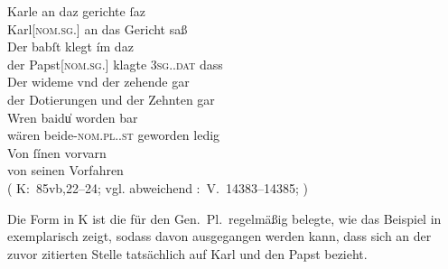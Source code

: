 \begin{exe}
\ex\label{ex:babstimbaideu}
	\gll Karle an daz gerichte ſaz \\
		Karl[\textsc{nom.sg.\MascM}] an das Gericht saß \\
\sn \gll Der babſt klegt ím daz \\
		der Papst[\textsc{nom.sg.\MascM}] klagte \textsc{3sg.\MascM.dat} dass \\
\sn \gll Der wideme vnd der zehende gar \\
		der Dotierungen und der Zehnten gar \\
\sn \gll Wren baidu̍ worden bar \\
		wären beide-\textsc{nom.pl.\NeutM.st} geworden ledig \\
\sn \gll Von ſínen vorvarn \\
		von seinen Vorfahren \\
	\trans {}
		(%
			K:~85vb,22--24; vgl. abweichend
			\KC:~V.~14383--14385;
			\cite[341]{schroeder1895}%
		)
\end{exe}

Die Form   in K ist die für den Gen.\ Pl.\ regelmäßig
belegte, wie das Beispiel in  exemplarisch zeigt, sodass davon
ausgegangen werden kann, dass sich   an der zuvor
zitierten Stelle tatsächlich auf Karl und den Papst bezieht.

